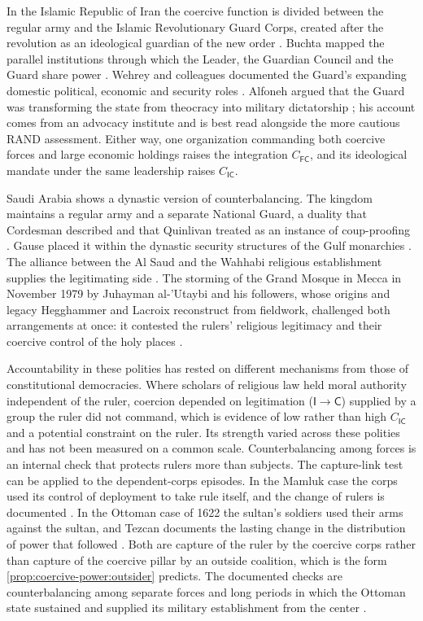 \documentclass[11pt,letterpaper]{article}
\theoremstyle{definition}
\theoremstyle{remark}
\newcommand{\pF}{\mathsf{F}}
\newcommand{\pI}{\mathsf{I}}
\newcommand{\pC}{\mathsf{C}}
\begin{document}
In the Islamic Republic of Iran the coercive function is divided between the regular army and the Islamic Revolutionary Guard Corps, created after the revolution as an ideological guardian of the new order \citep{katzman1993,arjomand1988}. Buchta mapped the parallel institutions through which the Leader, the Guardian Council and the Guard share power \citep{buchta2000}. Wehrey and colleagues documented the Guard's expanding domestic political, economic and security roles \citep{wehrey2009}. Alfoneh argued that the Guard was transforming the state from theocracy into military dictatorship \citep{alfoneh2013}; his account comes from an advocacy institute and is best read alongside the more cautious RAND assessment. Either way, one organization commanding both coercive forces and large economic holdings raises the integration $C_{\pF\pC}$, and its ideological mandate under the same leadership raises $C_{\pI\pC}$.

Saudi Arabia shows a dynastic version of counterbalancing. The kingdom maintains a regular army and a separate National Guard, a duality that Cordesman described and that Quinlivan treated as an instance of coup-proofing \citep{cordesman2003,quinlivan1999}. Gause placed it within the dynastic security structures of the Gulf monarchies \citep{gause1994}. The alliance between the Al Saud and the Wahhabi religious establishment supplies the legitimating side \citep{alrasheed2002}. The storming of the Grand Mosque in Mecca in November 1979 by Juhayman al-'Utaybi and his followers, whose origins and legacy Hegghammer and Lacroix reconstruct from fieldwork, challenged both arrangements at once: it contested the rulers' religious legitimacy and their coercive control of the holy places \citep{hegghammer2007}.

Accountability in these polities has rested on different mechanisms from those of constitutional democracies. Where scholars of religious law held moral authority independent of the ruler, coercion depended on legitimation ($\pI \to \pC$) supplied by a group the ruler did not command, which is evidence of low rather than high $C_{\pI\pC}$ and a potential constraint on the ruler. Its strength varied across these polities and has not been measured on a common scale. Counterbalancing among forces is an internal check that protects rulers more than subjects. The capture-link test can be applied to the dependent-corps episodes. In the Mamluk case the corps used its control of deployment to take rule itself, and the change of rulers is documented \citep{irwin1986}. In the Ottoman case of 1622 the sultan's soldiers used their arms against the sultan, and Tezcan documents the lasting change in the distribution of power that followed \citep{tezcan2010}. Both are capture of the ruler by the coercive corps rather than capture of the coercive pillar by an outside coalition, which is the form \cref{prop:coercive-power:outsider} predicts. The documented checks are counterbalancing among separate forces and long periods in which the Ottoman state sustained and supplied its military establishment from the center \citep{agoston2005}.
\end{document}
